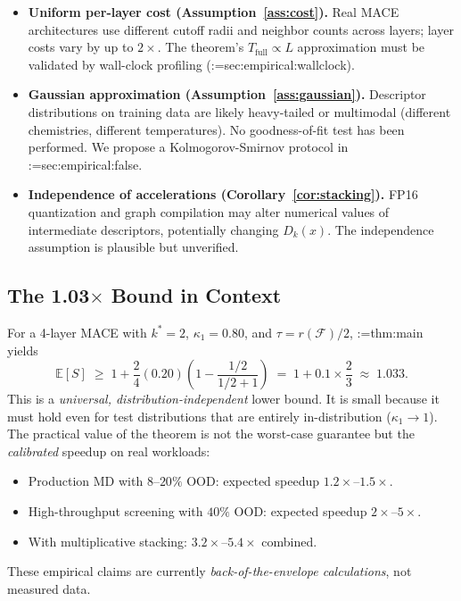 \documentclass[11pt,a4paper]{article}
\makeatletter
\newcommand{\cref}[1]{\begingroup\def\crefsep{}\@for\crefitem:=#1\do{\crefsep\ref{\crefitem}\def\crefsep{, }}\endgroup}
\makeatother
\begin{document}
\begin{itemize}
    \item \textbf{Uniform per-layer cost (Assumption~\ref{ass:cost}).} Real MACE architectures use different cutoff radii and neighbor counts across layers; layer costs vary by up to $2\times$. The theorem's $T_{\text{full}}\propto L$ approximation must be validated by wall-clock profiling (\cref{sec:empirical:wallclock}).
    \item \textbf{Gaussian approximation (Assumption~\ref{ass:gaussian}).} Descriptor distributions on training data are likely heavy-tailed or multimodal (different chemistries, different temperatures). No goodness-of-fit test has been performed. We propose a Kolmogorov-Smirnov protocol in \cref{sec:empirical:false}.
    \item \textbf{Independence of accelerations (Corollary~\ref{cor:stacking}).} FP16 quantization and graph compilation may alter numerical values of intermediate descriptors, potentially changing $D_k(x)$. The independence assumption is plausible but unverified.
\end{itemize}

\subsection{The 1.03$\times$ Bound in Context}\label{sec:103}

For a 4-layer MACE with $k^*=2$, $\kappa_1=0.80$, and $\tau=r(\mathcal{F})/2$, \cref{thm:main} yields
\begin{equation}
    \mathbb{E}[S] \;\ge\; 1 + \frac{2}{4}(0.20)\left(1-\frac{1/2}{1/2+1}\right)
    \;=\; 1 + 0.1 \times \frac{2}{3}
    \;\approx\; 1.033.
\end{equation}
This is a \emph{universal, distribution-independent} lower bound. It is small because it must hold even for test distributions that are entirely in-distribution ($\kappa_1\to 1$). The practical value of the theorem is not the worst-case guarantee but the \emph{calibrated} speedup on real workloads:
\begin{itemize}
    \item Production MD with $8$--$20\%$ OOD: expected speedup $1.2\times$--$1.5\times$.
    \item High-throughput screening with $40\%$ OOD: expected speedup $2\times$--$5\times$.
    \item With multiplicative stacking: $3.2\times$--$5.4\times$ combined.
\end{itemize}
These empirical claims are currently \emph{back-of-the-envelope calculations}, not measured data.
\end{document}
